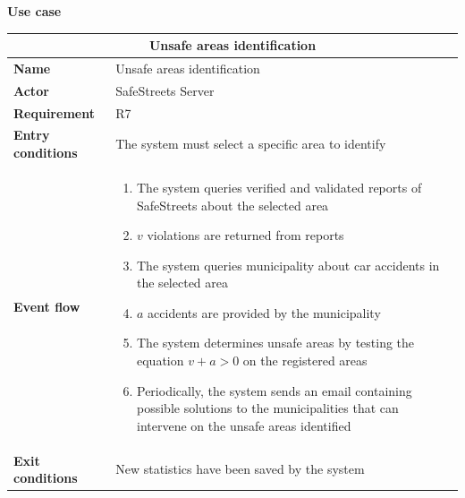 \begin{description}
    \item \textbf{Use case}
    \begin{center}
        \begin{tabular}{|p{3cm}|p{7cm}|}
            \multicolumn{2}{c}{\textbf{Unsafe areas identification}} \\
            \hline
            \textbf{Name} & Unsafe areas identification \\
            \hline
            \textbf{Actor} & SafeStreets Server \\
            \hline
            \textbf{Requirement} & R7 \\
            \hline
            \textbf{Entry conditions} &  The system must select a specific area to identify\\
            \hline
            \textbf{Event flow} &
            \begin{enumerate}
                \item The system queries verified and validated reports of SafeStreets about the selected area
                \item $v$ violations are returned from reports
                \item The system queries municipality about car accidents in the selected area
                \item $a$ accidents are provided by the municipality
                \item The system determines unsafe areas by testing the equation $v + a > 0$ on the registered areas
                \item Periodically, the system sends an email containing possible solutions to the municipalities that can intervene on the unsafe areas identified
            \end{enumerate} \\
            \hline
            \textbf{Exit conditions} & New statistics have been saved by the system \\
            \hline
        \end{tabular}
    \end{center}
\end{description}

